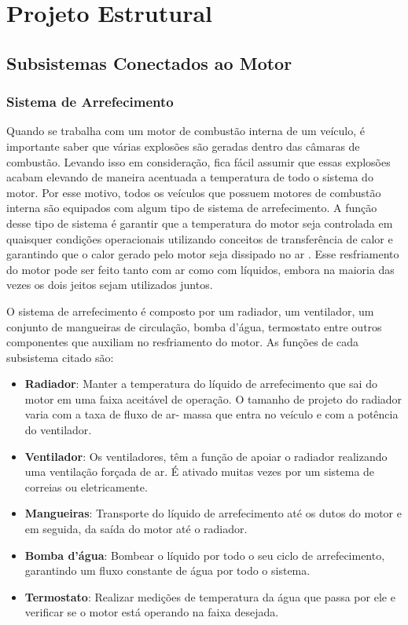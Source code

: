 \chapter[Projeto Estrutural]{Projeto Estrutural}

\section{Subsistemas Conectados ao Motor}

\subsection{Sistema de Arrefecimento}

	Quando se trabalha com um motor de combustão interna de um veículo, é importante saber que várias explosões são geradas dentro das câmaras de combustão. Levando isso em consideração, fica fácil assumir que essas explosões acabam elevando de maneira acentuada a temperatura de todo o sistema do motor. Por esse motivo, todos os veículos que possuem motores de combustão interna são equipados com algum tipo de sistema de arrefecimento. A função desse tipo de sistema é garantir que a temperatura do motor seja controlada em quaisquer condições operacionais utilizando conceitos de transferência de calor e garantindo que o calor gerado pelo motor seja dissipado no ar \cite{bosch2004}. Esse resfriamento do motor pode ser feito tanto com ar como com líquidos, embora na maioria das vezes os dois jeitos sejam utilizados juntos. 
	
	O sistema de arrefecimento é composto por um radiador, um ventilador, um conjunto de mangueiras de circulação, bomba d’água, termostato entre outros componentes que auxiliam no resfriamento do motor. 
	As funções de cada subsistema citado são:
	
\begin{itemize}
	\item \textbf{Radiador}: Manter a temperatura do líquido de arrefecimento que sai do motor em uma faixa aceitável de operação. O tamanho de projeto do radiador varia com a taxa de fluxo de ar- massa que entra no veículo e com a potência do ventilador.
	\item \textbf{Ventilador}: Os ventiladores, têm a função de apoiar o radiador realizando uma ventilação forçada de ar. É ativado muitas vezes por um sistema de correias ou eletricamente.
	\item \textbf{Mangueiras}: Transporte do líquido de arrefecimento até os dutos do motor e em seguida, da saída do motor até o radiador.
	\item \textbf{Bomba d’água}: Bombear o líquido por todo o seu ciclo de arrefecimento, garantindo um fluxo constante de água por todo o sistema.
	\item \textbf{Termostato}: Realizar medições de temperatura da água que passa por ele e verificar se o motor está operando na faixa desejada.
\end{itemize}

